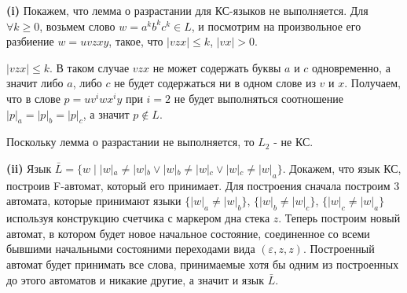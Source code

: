 \documentclass[10pt]{article}
\let \eps \varepsilon
\begin{document}
{\bf (i)}
Покажем, что лемма о разрастании для КС-языков не выполняется.
Для $\forall k \geq 0$, возьмем слово $w = a^k b^k c^k \in L$, и посмотрим на произвольное его разбиение $w = uvzxy$, такое, что $|vzx| \leq k$, $|vx| > 0$.

$|vzx| \leq k$. В таком случае $vzx$ не может содержать буквы $a$ и $c$ одновременно, а значит либо $a$, либо $c$ не будет содержаться ни в одном слове из $v$ и $x$. Получаем, что в слове $p = u v^i w x^i y$ при $i = 2$ не будет выполняться соотношение $|p|_a = |p|_b = |p|_c$, а значит $p \notin L$.

Поскольку лемма о разрастании не выполняется, то $L_2$ - не КС.

\smallskip

{\bf (ii)}
Язык $\bar{L} = \{ w \; | \;|w|_a \neq |w|_b \vee |w|_b \neq |w|_c \vee |w|_c \neq |w|_a \}$. Докажем, что язык КС, построив F-автомат, который его принимает. Для построения сначала построим 3 автомата, которые принимают языки $\{ |w|_a \neq |w|_b \}$, $\{ |w|_b \neq |w|_c \}$, $\{ |w|_c \neq |w|_a \}$ используя конструкцию счетчика с маркером дна стека $z$. Теперь построим новый автомат, в котором будет новое начальное состояние, соединенное со всеми бывшими начальными состояними переходами вида $(\eps, z, z)$. Построенный автомат будет принимать все слова, принимаемые хотя бы одним из построенных до этого автоматов и никакие другие, а значит и язык $\bar{L}$.
\end{document}
